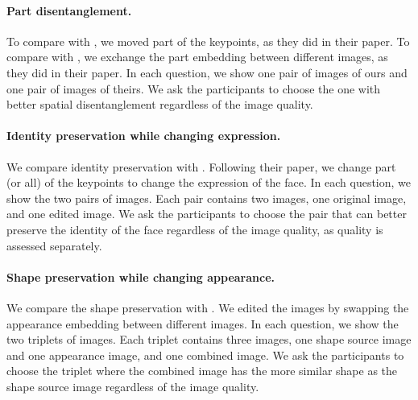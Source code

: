 \documentclass[10pt, conference, compsocconf]{IEEEtran}
\begin{document}
\paragraph{Part disentanglement.} To compare with \cite{zhang2018unsupervised}, we moved part of the keypoints, as they did in their paper. To compare with \cite{zhu2020sean}, we exchange the part embedding between different images, as they did in their paper. In each question, we show one pair of images of ours and one pair of images of theirs. We ask the participants to choose the one with better spatial disentanglement regardless of the image quality. 

\paragraph{Identity preservation while changing expression.}
We compare identity preservation with \cite{zhang2018unsupervised}. Following their paper, we change part (or all) of the keypoints to change the expression of the face. In each question, we show the two pairs of images. Each pair contains two images, one original image, and one edited image. We ask the participants to choose the pair that can better preserve the identity of the face regardless of the image quality, as quality is assessed separately. 

\paragraph{Shape preservation while changing appearance.} We compare the shape preservation with \cite{zhu2020sean}. We edited the images by swapping the appearance embedding between different images. In each question, we show the two triplets of images. Each triplet contains three images, one shape source image and one appearance image, and one combined image. We ask the participants to choose the triplet where the combined image has the more similar shape as the shape source image regardless of the image quality.
\end{document}

